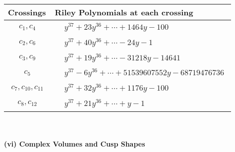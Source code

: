 \documentclass[1p]{elsarticle_modified}
\theoremstyle{definition}
\begin{document}
\begin{tabular}{m{50pt}|m{274pt}}
Crossings & \hspace{64pt}Riley Polynomials at each crossing \\
\hline $$\begin{aligned}c_{1},c_{4}\end{aligned}$$&$\begin{aligned}
&y^{37}+23 y^{36}+\cdots+1464 y-100
\end{aligned}$\\
\hline $$\begin{aligned}c_{2},c_{6}\end{aligned}$$&$\begin{aligned}
&y^{37}+40 y^{36}+\cdots-24 y-1
\end{aligned}$\\
\hline $$\begin{aligned}c_{3},c_{9}\end{aligned}$$&$\begin{aligned}
&y^{37}+19 y^{36}+\cdots-31218 y-14641
\end{aligned}$\\
\hline $$\begin{aligned}c_{5}\end{aligned}$$&$\begin{aligned}
&y^{37}-6 y^{36}+\cdots+51539607552 y-68719476736
\end{aligned}$\\
\hline $$\begin{aligned}c_{7},c_{10},c_{11}\end{aligned}$$&$\begin{aligned}
&y^{37}+32 y^{36}+\cdots+1176 y-100
\end{aligned}$\\
\hline $$\begin{aligned}c_{8},c_{12}\end{aligned}$$&$\begin{aligned}
&y^{37}+21 y^{36}+\cdots+y-1
\end{aligned}$\\
\hline
\end{tabular}\\~\\
\newpage\flushleft \textbf{(vi) Complex Volumes and Cusp Shapes}
\end{document}
